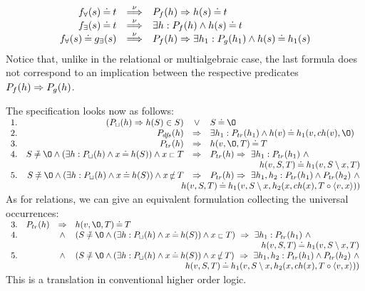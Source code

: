\begin{equation}\label{eq:predsnu}
\begin{array}{rcl}
f_\forall(s) \mathbin{\doteq} t & \mathbin{\stackrel{\nu}{\Longrightarrow}} & P_{f}(h)\mathrel\Rightarrow h(s)\mathbin{\doteq} t \\ f_\exists(s) \mathbin{\doteq} t & \mathbin{\stackrel{\nu}{\Longrightarrow}} & \exists h: P_{f}(h)\land h(s)\mathbin{\doteq} t\\ f_\forall(s) \mathbin{\doteq} g_\exists(s) & \mathbin{\stackrel{\nu}{\Longrightarrow}} &
P_{f}(h)\mathrel\Rightarrow \exists h_1 :P_{g}(h_1)\land h(s)\mathbin{\doteq} h_1(s) \\ \end{array}
\end{equation}
Notice that, unlike in the relational or multialgebraic case, the last formula does not correspond to an implication between the respective predicates $P_{f}(h)\mathrel\Rightarrow P_{g}(h)$. 

The specification looks now as follows:\\[1ex] \(\begin{array}{rrcl}
1.& (\Pre P\ch(h) \impl h(S)\in S)& \lor & S\Eq\es \\ 2. & \Pre P{\dfs}(h) & \impl
&\exists h_1: \Pre P{tr}(h_1)\land h(v)\Eq h_1(v,ch(v),\es)\ \ \\ 3. & \Pre P{tr}(h) & \impl & h(v,\es,T)\Eq T \\ 4. & S\Not\Eq\es\land (\exists h :\Pre P\ch(h)\land x\Eq h(S))\land x\lin T & \impl & \Pre P{tr}(h)\impl\ \exists h_1 :\Pre P{tr}(h_1)\ \land \\ \multicolumn{4}{r}{ h(v,S,T)\Eq h_1(v,S\setminus x,T)} \\ 5.& S\Not\Eq\es\land (\exists h :\Pre P\ch(h)\land x\Eq h(S))\land x\Not\lin T
& \impl & \Pre P{tr}(h) \impl\ \exists h_1,h_2 : \Pre P{tr}(h_1)\land\Pre 
P{tr}(h_2)\ \land \\
\multicolumn{4}{r}{h(v,S,T)\Eq h_1(v,S\setminus x,h_2(x,ch(x),T\ap\<v,x\>))} \end{array} \)\\[1ex]
\noindent
As for relations, we can give an equivalent formulation collecting the universal occurrences:\\[1ex]
\(\begin{array}{rrcl}
3. & \Pre P{tr}(h) & \impl & h(v,\es,T)\Eq T\ \\ 
4.& &\land&(S\Not\Eq\es\land (\exists h :\Pre P\ch(h)\land x\Eq h(S))\land x\lin T)\
\impl\ \exists h_1:\Pre P{tr}(h_1)\ \land \\ \multicolumn{4}{r}{ h(v,S,T)\Eq h_1(v,S\setminus x,T)} \\ 
5.& &\land & (S\Not\Eq\es\land (\exists h :\Pre P\ch(h)\land x\Eq h(S))\land x\Not\lin T)\ \impl\ \exists h_1,h_2: \Pre P{tr}(h_1)\land\Pre P{tr}(h_2)\ \land \\
\multicolumn{4}{r}{h(v,S,T)\Eq h_1(v,S\setminus x,h_2(x,ch(x),T\ap\<v,x\>))} \end{array} \)\\[1ex]
\noindent
This is a translation in conventional higher order logic. 

